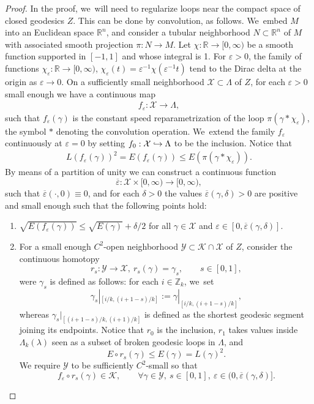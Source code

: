 \documentclass[11pt]{article}
\let\epsilon\varepsilon
\newcommand\hto{\mathrel{\lhook\joinrel\to}}
\newcommand{\Z}{\mathbb{Z}}
\newcommand{\R}{\mathbb{R}}
\newcommand{\KK}{\mathcal{K}}
\newcommand{\XX}{\mathcal{X}}
\newcommand{\YY}{\mathcal{Y}}
\theoremstyle{plain}
\theoremstyle{definition}
\begin{document}
\begin{proof}
In the proof, we~will need to regularize loops near the compact space of closed geodesics $Z$. This can be done by convolution, as follows. We~embed $M$ into an Euclidean space $\R^n$, and consider a tubular neighborhood $N\subset\R^n$ of $M$ with associated smooth projection $\pi:N\to M$. Let $\chi:\R\to[0,\infty)$ be a smooth function supported in $[-1,1]$ and whose integral is 1. For $\epsilon>0$, the family of functions
\hbox{$\chi_\epsilon:\R\to[0,\infty)$}, $\chi_\epsilon(t)=\epsilon^{-1}\chi(\epsilon^{-1}t)$
tend to the Dirac delta at the origin as $\epsilon\to0$. On a sufficiently small neighborhood $\XX\subset\Lambda$ of $Z$, for each $\epsilon>0$ small enough we have a continuous map
\begin{align*}
f_\epsilon:\XX \to \Lambda,
\end{align*}
such that $f_\epsilon(\gamma)$ is the constant speed reparametrization of the loop $\pi(\gamma*\chi_\epsilon)$, the symbol $*$ denoting the convolution operation. We~extend the family $f_\epsilon$ continuously at $\epsilon=0$ by setting $f_0:\XX \hto \Lambda$ to be the inclusion.
Notice that
\begin{align*}
L(f_\epsilon(\gamma))^2
=
E(f_\epsilon(\gamma))
\leq
E(\pi(\gamma*\chi_\epsilon)).
\end{align*}
By means of a partition of unity we can construct a continuous function
\[
\overline\epsilon:\XX\times[0,\infty)\to[0,\infty),
\]
such that $\overline\epsilon(\cdot,0)\equiv0$, and for each $\delta>0$ the values $\overline\epsilon(\gamma,\delta)>0$ are positive and small enough such that the following points hold:
\begin{enumerate}
\item\label{l:finitely_generatedi}
$\sqrt{E(f_\epsilon(\gamma))}\leq \sqrt{E(\gamma)}+\delta/2$ for all $\gamma\in\XX$ and $\epsilon\in[0,\overline\epsilon(\gamma,\delta)]$.

\item\label{l:finitely_generatedii}
For a small enough $C^2$-open neighborhood $\YY\subset\KK\cap\XX$ of $Z$,
consider the continuous homotopy
\[
r_s:\YY\to\XX,\ r_s(\gamma)=\gamma_s,\qquad s\in[0,1],
\]
were $\gamma_s$ is defined as follows: for each $i\in\Z_k$, we~set
\[
\gamma_s|_{[i/k,(i+1-s)/k]}:=\gamma|_{[i/k,(i+1-s)/k]},
\]
whereas $\gamma_s|_{[(i+1-s)/k,(i+1)/k]}$ is defined as the shortest geodesic segment joining its endpoints. Notice that $r_0$ is the inclusion, $r_1$ takes values inside $\Lambda_k(\lambda)$ seen as a subset of broken geodesic loops in $\Lambda$, and
\[
E\circ r_s(\gamma)\leq E(\gamma)= L(\gamma)^2.
\]
We require $\YY$ to be sufficiently $C^2$-small so that
\[
f_\epsilon\circ r_s(\gamma)\in\KK,\qquad\forall \gamma\in\YY,\ s\in[0,1],\ \epsilon\in(0,\overline\epsilon(\gamma,\delta)].
\]


\end{enumerate}
\end{proof}
\end{document}
